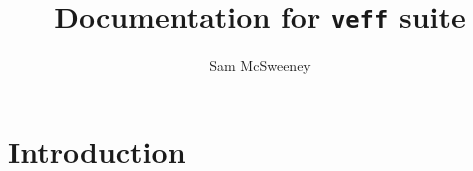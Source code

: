 \documentclass{article}
\title{Documentation for \texttt{veff} suite}
\author{Sam McSweeney}
\begin{document}
\maketitle

\section{Introduction}
\end{document}
